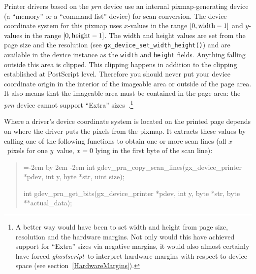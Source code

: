\documentclass[twoside,a4paper]{article}
\newcommand{\gs}{\textit{ghostscript\/}}
\newcommand{\prog}[1]{\texttt{#1}}
\begin{document}
Printer drivers based on the \textit{prn\/} device use an internal
pixmap-generating device (a ``memory'' or a ``command list'' device)
for scan conversion.
The device coordinate system for this pixmap uses $x$-values in the range
$[0, \hbox{width}-1]$ and $y$-values in the range $[0, \hbox{height}-1]$.
The width and height values are set from the page size and the resolution
(see \prog{gx\_device\_set\_width\_height()})	%
and are available in the device instance as the \prog{width} and \prog{height}
fields.
Anything falling outside this area is clipped.	%
This clipping happens in addition to the clipping established at PostScript
level.
Therefore you should never put your device coordinate origin in the interior
of the imageable area or outside of the page area.
It also means that the imageable area must be contained in the page area:
the \textit{prn\/} device cannot support ``Extra''
sizes~\cite[Appendix~B]{PPD4.3}.\footnote{
  A better way would have been to set width and height from page size,
  resolution and the hardware margins.
  Not only would this have achieved support for ``Extra'' sizes via negative
  margins,
  it would also almost certainly have forced \gs\ to interpret hardware margins
  with respect to device space (see section~\ref{HardwareMargins}).}

Where a driver's device coordinate system is located on the printed page
depends on where the driver puts the pixels from the pixmap.
It extracts these values by calling one of the following functions to obtain
one or more scan lines (all $x$~pixels for one $y$~value,
$x = 0$ lying in the first byte of the scan line):
\begin{quote}
  \tt\raggedright \parindent=-2em \advance\leftskip by 2em
  \noindent\kern-2em
  int gdev\_prn\_copy\_scan\_lines(gx\_device\_printer *pdev, int y,
    byte *str,  uint size);

  int gdev\_prn\_get\_bits(gx\_device\_printer *pdev, int y,
    byte *str,  byte **actual\_data);
\end{quote}
\end{document}
